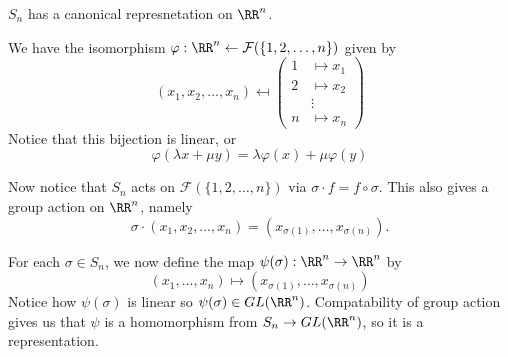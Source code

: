 \begin{ex}
$S_n$ has a canonical represnetation on $\RR^n$.

We have the isomorphism
$\varphi : \RR^n \leftarrow \mathcal{F}(\lbrace 1, 2, \dots, n\rbrace)$
given by
\[ (x_1, x_2, \dots, x_n) \mapsfrom \left(\begin{aligned}
1 &\mapsto x_1 \\
2 &\mapsto x_2 \\
&\vdots \\
n &\mapsto x_n
\end{aligned}\right) \]
Notice that this bijection is linear, or
\[ \varphi(\lambda x + \mu y) = \lambda\varphi(x) + \mu\varphi(y) \]

Now notice that $S_n$ acts on $\mathcal{F}(\lbrace 1, 2, \dots,
n\rbrace)$ via $\sigma \cdot f = f \circ \sigma$. This also gives a
group action on $\RR^n$, namely
\[ \sigma \cdot (x_1, x_2, \dots, x_n) = (x_{\sigma(1)}, \dots,
x_{\sigma(n)}). \]

For each $\sigma \in S_n$, we now define the map $\psi(\sigma) : \RR^n
\to \RR^n$ by
\[ (x_1, \dots, x_n) \mapsto (x_{\sigma(1)}, \dots, x_{\sigma(n)}) \]
Notice how $\psi(\sigma)$ is linear so $\psi(\sigma) \in GL(\RR^n)$.
Compatability of group action gives us that $\psi$ is a homomorphism
from $S_n \to GL(\RR^n)$, so it is a representation.
\end{ex}
